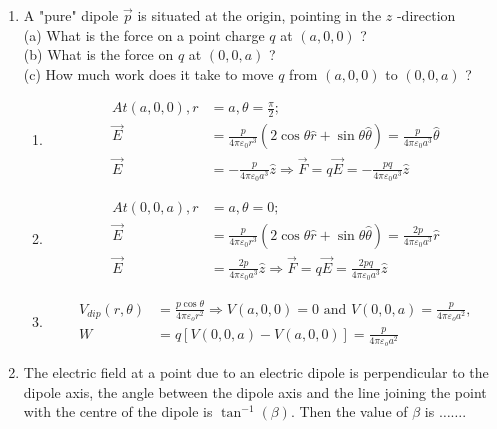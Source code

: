 \begin{enumerate} [label=\color{ocre}\textbf{\arabic*.}]
	\item 	 A "pure" dipole $\vec{p}$ is situated at the origin, pointing in the $z$ -direction
	\\(a) What is the force on a point charge $q$ at $(a, 0,0)$ ?
	\\(b) What is the force on $q$ at $(0,0, a)$ ?
	\\(c) How much work does it take to move $q$ from $(a, 0,0)$ to $(0,0, a)$ ?
	\begin{answer}\hspace{0.5cm}
	\begin{enumerate}
		\item \begin{align*}
			 A t(a, 0,0), r&=a, \theta=\frac{\pi}{2} ; \\\vec{E}&=\frac{p}{4 \pi \varepsilon_{0} r^{3}}(2 \cos \theta \hat{r}+\sin \theta \hat{\theta})=\frac{p}{4 \pi \varepsilon_{0} a^{3}} \hat{\theta} \\
			\vec{E}&=-\frac{p}{4 \pi \varepsilon_{0} a^{3}} \hat{z} \Rightarrow \vec{F}=q \vec{E}=-\frac{p q}{4 \pi \varepsilon_{0} a^{3}} \hat{z}
			\end{align*}
			\item \begin{align*}
				A t(0,0, a), r&=a, \theta=0 ;\\ \vec{E}&=\frac{p}{4 \pi \varepsilon_{0} r^{3}}(2 \cos \theta \hat{r}+\sin \theta \hat{\theta})=\frac{2 p}{4 \pi \varepsilon_{0} a^{3}} \hat{r} \\
			\vec{E}&=\frac{2 p}{4 \pi \varepsilon_{0} a^{3}} \hat{z} \Rightarrow \vec{F}=q \vec{E}=\frac{2 p q}{4 \pi \varepsilon_{0} a^{3}} \hat{z}
			\end{align*}
			\item \begin{align*}
				 V_{d i p}(r, \theta)&=\frac{p \cos \theta}{4 \pi \varepsilon_{o} r^{2}} \Rightarrow V(a, 0,0)=0 \text { and } V(0,0, a)=\frac{p}{4 \pi \varepsilon_{o} a^{2}}, \\
			W&=q[V(0,0, a)-V(a, 0,0)]=\frac{p}{4 \pi \varepsilon_{o} a^{2}}
			\end{align*}
	\end{enumerate}
	
	\end{answer}
\item The electric field at a point due to an electric dipole is perpendicular to the dipole axis, the
angle between the dipole axis and the line joining the point with the centre of the dipole
is $\tan ^{-1}(\beta)$. Then the value of $\beta$ is $\ldots \ldots$.
\begin{answer}



\end{answer}
\end{enumerate}
